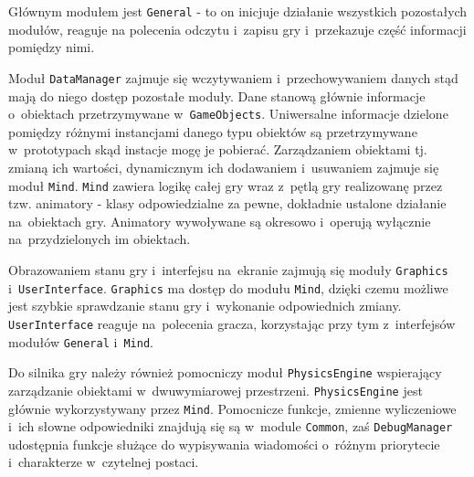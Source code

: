 \documentclass[licencjacka]{pracamgr}
\begin{document}
    Głównym modułem jest \texttt{General} - to on inicjuje działanie wszystkich pozostałych modułów, reaguje na
    polecenia odczytu i~zapisu gry i~przekazuje część informacji pomiędzy nimi.

    Moduł \texttt{DataManager} zajmuje się
    wczytywaniem i~przechowywaniem danych stąd mają do niego dostęp pozostałe moduły. Dane stanową głównie informacje
    o~obiektach przetrzymywane w~\texttt{GameObjects}. Uniwersalne informacje dzielone pomiędzy różnymi instancjami danego
    typu obiektów są przetrzymywane w~prototypach skąd instacje mogę je pobierać. Zarządzaniem obiektami tj. zmianą ich wartości,
    dynamicznym ich dodawaniem i~usuwaniem zajmuje się moduł \texttt{Mind}. \texttt{Mind} zawiera logikę całej gry wraz z~pętlą gry
    realizowanę przez tzw. animatory - klasy odpowiedzialne za pewne, dokładnie ustalone działanie na~obiektach gry.
    Animatory wywoływane są okresowo i~operują wyłącznie na~przydzielonych im obiektach.

    Obrazowaniem stanu gry i~interfejsu na~ekranie zajmują się moduły \texttt{Graphics} i~\texttt{UserInterface}.
    \texttt{Graphics} ma dostęp do modułu \texttt{Mind}, dzięki czemu możliwe jest szybkie sprawdzanie stanu
    gry i~wykonanie odpowiednich zmiany. \texttt{UserInterface} reaguje na~polecenia gracza, korzystając przy tym z~interfejsów modułów
    \texttt{General} i~\texttt{Mind}.

    Do silnika gry należy również pomocniczy moduł \texttt{PhysicsEngine} wspierający zarządzanie obiektami w~dwuwymiarowej przestrzeni.
    \texttt{PhysicsEngine} jest głównie wykorzystywany przez \texttt{Mind}. Pomocnicze funkcje, zmienne wyliczeniowe i~ich słowne 
    odpowiedniki znajdują się są w~module \texttt{Common}, zaś \texttt{DebugManager} udostępnia funkcje służące do wypisywania wiadomości
    o~różnym priorytecie i~charakterze w~czytelnej postaci.
\end{document}
